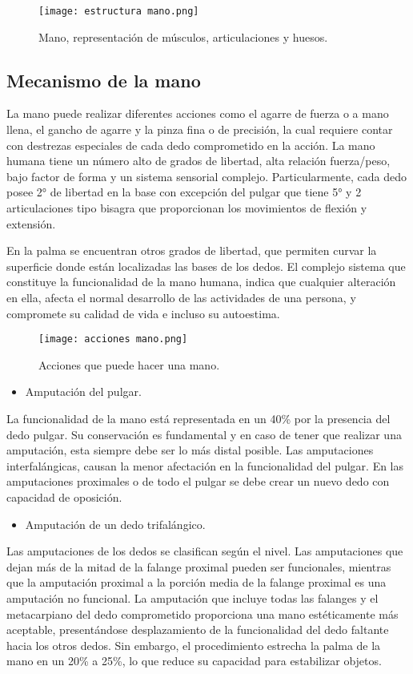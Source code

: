 \documentclass[a4paper]{article}
\begin{document}
\begin{figure}[h]
\centering
\texttt{[image: estructura mano.png]}
\caption{\label{fig:biomec1}Mano, representación de músculos, articulaciones y huesos.}
\end{figure}

\subsection{Mecanismo de la mano}
La mano puede realizar diferentes acciones como el agarre de fuerza o a mano llena, el gancho de agarre y la pinza fina o de precisión, la cual requiere contar con destrezas especiales de cada dedo comprometido en la acción. La mano humana tiene un número alto de grados de libertad, alta relación fuerza/peso, bajo factor de forma y un sistema sensorial complejo. Particularmente, cada dedo posee 2° de libertad en la base con excepción del pulgar que tiene 5° y 2 articulaciones tipo bisagra que proporcionan los movimientos de flexión y extensión.  

En la palma se encuentran otros grados de libertad, que permiten curvar la superficie donde están localizadas las bases de los dedos. El complejo sistema que constituye la funcionalidad de la mano humana, indica que cualquier alteración en ella, afecta el normal desarrollo de las actividades de una persona, y compromete su calidad de vida e incluso su autoestima. 

\begin{figure}[h]
\centering
\texttt{[image: acciones mano.png]}
\caption{\label{fig:biomec1}Acciones que puede hacer una mano.}
\end{figure}

\begin{itemize}
    \item Amputación del pulgar.
\end{itemize}

La funcionalidad de la mano está representada en un 40\% por la presencia del dedo pulgar. Su conservación es fundamental y en caso de tener que realizar una amputación, esta siempre debe ser lo más distal posible. Las amputaciones interfalángicas, causan la menor afectación en la funcionalidad del pulgar. En las amputaciones proximales o de todo el pulgar se debe crear un nuevo dedo con capacidad de oposición. 

\begin{itemize}
    \item Amputación de un dedo trifalángico.
\end{itemize}
Las amputaciones de los dedos se clasifican según el nivel. Las amputaciones que dejan más de la mitad de la falange proximal pueden ser funcionales, mientras que la amputación proximal a la porción media de la falange proximal es una amputación no funcional. La amputación que incluye todas las falanges y el metacarpiano del dedo comprometido proporciona una mano estéticamente más aceptable, presentándose desplazamiento de la funcionalidad del dedo faltante hacia los otros dedos. Sin embargo, el procedimiento estrecha la palma de la mano en un 20\% a 25\%, lo que reduce su capacidad para estabilizar objetos. 
\end{document}
